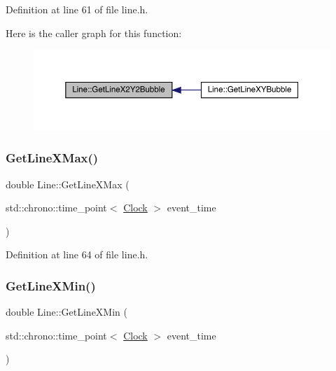 Definition at line 61 of file line.\+h.

Here is the caller graph for this function\+:\nopagebreak
\begin{figure}[H]
\begin{center}
\leavevmode
\includegraphics[width=350pt]{class_line_a2432406f734963e4497541081a843131_icgraph}
\end{center}
\end{figure}
\mbox{\label{class_line_a1393a4dcd9fa9e1ab1653c37d76c8c3a}} 
\subsubsection{\texorpdfstring{Get\+Line\+X\+Max()}{GetLineXMax()}}
{\footnotesize\ttfamily double Line\+::\+Get\+Line\+X\+Max (\begin{DoxyParamCaption}\item[{std\+::chrono\+::time\+\_\+point$<$ \hyperlink{universe_8h_a0ef8d951d1ca5ab3cfaf7ab4c7a6fd80}{Clock} $>$}]{event\+\_\+time }\end{DoxyParamCaption})\hspace{0.3cm}{\ttfamily [inline]}}



Definition at line 64 of file line.\+h.

\mbox{\label{class_line_ac4a6e8f232b529169d91b9f44496933b}} 
\subsubsection{\texorpdfstring{Get\+Line\+X\+Min()}{GetLineXMin()}}
{\footnotesize\ttfamily double Line\+::\+Get\+Line\+X\+Min (\begin{DoxyParamCaption}\item[{std\+::chrono\+::time\+\_\+point$<$ \hyperlink{universe_8h_a0ef8d951d1ca5ab3cfaf7ab4c7a6fd80}{Clock} $>$}]{event\+\_\+time }\end{DoxyParamCaption})\hspace{0.3cm}{\ttfamily [inline]}}



